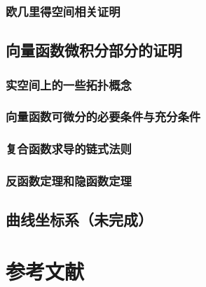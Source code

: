 \documentclass[zihao=-4,linespread=1.5,a4paper,heading=true,twoside]{ctexbook}
\theoremstyle{definition}
\theoremstyle{plain}
\begin{document}
\section{欧几里得空间相关证明}\label{sec:A.4}


\chapter{向量函数微积分部分的证明}\label{sec:B}
\section{实空间上的一些拓扑概念}\label{sec:B.1}


\section{向量函数可微分的必要条件与充分条件}\label{sec:B.2}


\section{复合函数求导的链式法则}\label{sec:B.3}


\section{反函数定理和隐函数定理}\label{sec:B.4}


%

\chapter{曲线坐标系（未完成）}\label{sec:C}
%


\newpage\part*{参考文献}
\printbibliography[heading=none]
\end{document}
